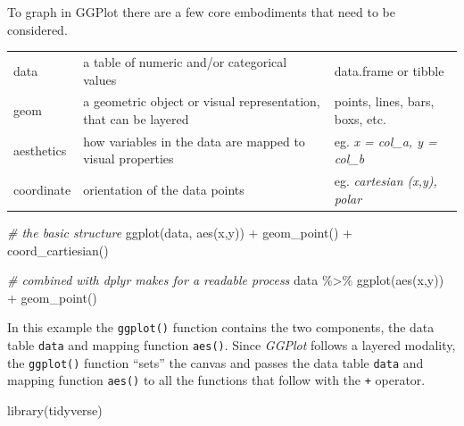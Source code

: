 \documentclass[
]{book}
\newenvironment{Shaded}{\begin{snugshade}}{\end{snugshade}}
\newcommand{\CommentTok}[1]{\textcolor[rgb]{0.56,0.35,0.01}{\textit{#1}}}
\newcommand{\FunctionTok}[1]{\textcolor[rgb]{0.00,0.00,0.00}{#1}}
\newcommand{\NormalTok}[1]{#1}
\newcommand{\SpecialCharTok}[1]{\textcolor[rgb]{0.00,0.00,0.00}{#1}}
\begin{document}
To graph in GGPlot there are a few core embodiments that need to be considered.

\begin{longtable}[]{@{}
  >{\raggedright\arraybackslash}p{}
  >{\raggedright\arraybackslash}p{}
  >{\raggedright\arraybackslash}p{}@{}}
\toprule\noalign{}
\endhead
\bottomrule\noalign{}
\endlastfoot
data & a table of numeric and/or categorical values & data.frame or tibble \\
geom & a geometric object or visual representation, that can be layered & points, lines, bars, boxs, etc. \\
aesthetics & how variables in the data are mapped to visual properties & eg. \emph{x = col\_a, y = col\_b} \\
coordinate & orientation of the data points & eg. \emph{cartesian (x,y), polar} \\
\end{longtable}

\begin{Shaded}
\begin{Highlighting}[]
\CommentTok{\# the basic structure}
\FunctionTok{ggplot}\NormalTok{(data, }\FunctionTok{aes}\NormalTok{(x,y)) }\SpecialCharTok{+} \FunctionTok{geom\_point}\NormalTok{() }\SpecialCharTok{+} \FunctionTok{coord\_cartiesian}\NormalTok{()}

\CommentTok{\# combined with dplyr makes for a readable process}
\NormalTok{data }\SpecialCharTok{\%\textgreater{}\%} \FunctionTok{ggplot}\NormalTok{(}\FunctionTok{aes}\NormalTok{(x,y)) }\SpecialCharTok{+} \FunctionTok{geom\_point}\NormalTok{()}
\end{Highlighting}
\end{Shaded}

In this example the \texttt{ggplot()} function contains the two components, the data table \texttt{data} and mapping function \texttt{aes()}. Since \emph{GGPlot} follows a layered modality, the \texttt{ggplot()} function ``sets'' the canvas and passes the data table \texttt{data} and mapping function \texttt{aes()} to all the functions that follow with the \texttt{+} operator.

\begin{Shaded}
\begin{Highlighting}[]
\FunctionTok{library}\NormalTok{(tidyverse)}
\end{Highlighting}
\end{Shaded}
\end{document}
